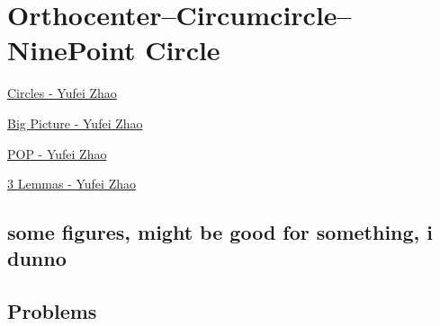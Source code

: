\graphicspath{{Pics/}}


\newpage\section{Orthocenter--Circumcircle--NinePoint Circle}
	

	\begin{myitemize}
		\item \href{http://yufeizhao.com/olympiad/imo2008/zhao-circles.pdf}{Circles - Yufei Zhao}
		\item \href{http://yufeizhao.com/olympiad/cyclic_quad.pdf}{Big Picture - Yufei Zhao}
		\item \href{http://yufeizhao.com/olympiad/power_of_a_point.pdf}{POP - Yufei Zhao}
		\item \href{http://yufeizhao.com/olympiad/three_geometry_lemmas.pdf}{3 Lemmas - Yufei Zhao}
	\end{myitemize}
	
	
	\subsection{some figures, might be good for something, i dunno}
	
	
	
	
	\subsection{Problems}

	
	\begin{minipage}{.3\textwidth}
	\end{minipage}\hfill%
	\begin{minipage}{.65\textwidth}
	\end{minipage}
	

	
	
	

	
	
